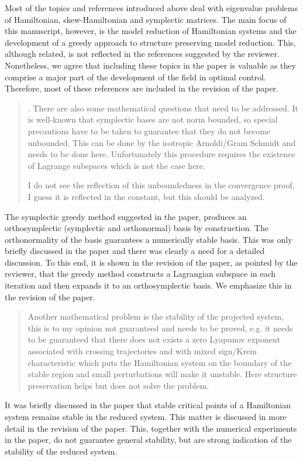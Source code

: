 \documentclass[a4paper]{article}
\newcommand{\breview}{\begin{quotation}\begin{bf}\noindent}
\newcommand{\ereview}{\end{bf}\end{quotation}}
\begin{document}
Most of the topics and references introduced above deal with eigenvalue problems of Hamiltonian, skew-Hamiltonian and symplectic matrices. The main focus of this manuscript, however, is the model reduction of Hamiltonian systems and the development of a greedy approach to structure preserving model reduction. This, although related, is not reflected in the references suggested by the reviewer. Nonetheless, we agree that including these topics in the paper is valuable as they comprise a major part of the development of the field in optimal control. Therefore, most of these references are included in the revision of the paper.

\breview
2. There are also some mathematical questions that need to be addressed. It is well-known that symplectic bases are not norm bounded, so special precautions have to be taken to guarantee that they do not become unbounded. This can be done by the isotropic Arnoldi/Gram Schmidt and needs to be done here. Unfortunately this procedure requires the existence of Lagrange subspaces which is not the case here.

I do not see the reflection of this unboundedness in the convergence proof, I guess it is reflected in the constant, but this should be analyzed. 
\ereview
The symplectic greedy method suggested in the paper, produces an orthosymplectic (symplectic and orthonormal) basis by construction. The orthonormality of the basis guarantees a numerically stable basis. This was only briefly discussed in the paper and there was clearly a need for a detailed discussion. To this end, it is shown in the revision of the paper, as pointed by the reviewer, that the greedy method constructs a Lagrangian subspace in each iteration and then expands it to an orthosymplectic basis. We emphasize this in the revision of the paper.

\breview
Another mathematical problem is the stability of the projected system, this is to my opinion not guaranteed and needs to be proved, e.g. it needs to be guaranteed that there does not exists a zero Lyapunov exponent associated with crossing trajectories and with mixed sign/Krein characteristic which puts the Hamiltonian system on the boundary of the stable region and small perturbations will make it unstable. Here structure preservation helps but does not solve the problem.
\ereview

It was briefly discussed in the paper that stable critical points of a Hamiltonian system remains stable in the reduced system. This matter is discussed in more detail in the revision of the paper. This, together with the numerical experiments in the paper, do not guarantee general stability, but are strong indication of the stability of the reduced system.
\end{document}
